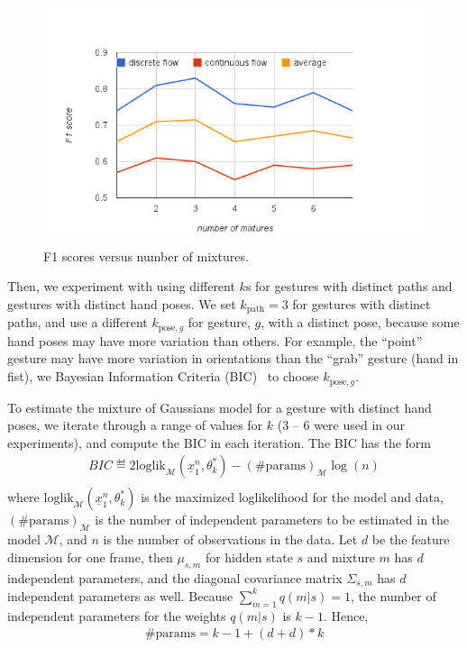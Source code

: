 \begin{figure}[t]
\centering
\includegraphics[trim=10mm 5mm 10mm 15mm,
clip, width=\columnwidth]{figures/f1_nM.png}
\caption{F1 scores versus number of mixtures.}
\label{fig:mixtures}
\end{figure}

Then, we experiment with using different $k$s for gestures with distinct paths
and gestures with distinct hand poses. We set $k_\text{path} = 3$ for
gestures with distinct paths, and use a different $k_{\text{pose}, g}$ for
gesture, $g$, with a distinct pose, because some hand poses may have more
variation than others.
For example, the ``point'' gesture may have more variation in orientations than the ``grab'' gesture
(hand in fist), we Bayesian Information Criteria
(BIC)~\cite{fraley06} to choose $k_{\text{pose}, g}$.

To estimate the mixture of Gaussians model for a gesture with distinct hand
poses, we iterate through a range of values for $k$ (3 -- 6
were used in our experiments), and compute the BIC in each iteration. The BIC has the
form~\cite{fraley06}
\begin{align}
BIC\eqdef 2\text{loglik}_\mathcal{M}(\underline{x}_1^n, \theta_k^*) - (\#
\text{params})_\mathcal{M} \log(n) \\
\end{align}
where $\text{loglik}_\mathcal{M}(\underline{x}_1^n, \theta_k^*)$ is the
maximized loglikelihood for the model and data, $(\#
\text{params})_\mathcal{M}$ is the number of independent parameters to be
estimated in the model $\mathcal{M}$, and $n$ is the number of observations in
the data. Let $d$ be the feature dimension for one frame, then $\mu_{s,m}$ for
hidden state $s$ and mixture $m$ has $d$ independent parameters, and the
diagonal covariance matrix $\Sigma_{s,m}$ has $d$ independent parameters as
well. Because $\sum_{m=1}^k q(m | s) = 1$, the number of independent parameters
for the weights $q(m|s)$ is $k - 1$. Hence,
\begin{align}
\#\text{params} = k - 1 + (d + d) * k
\end{align}

